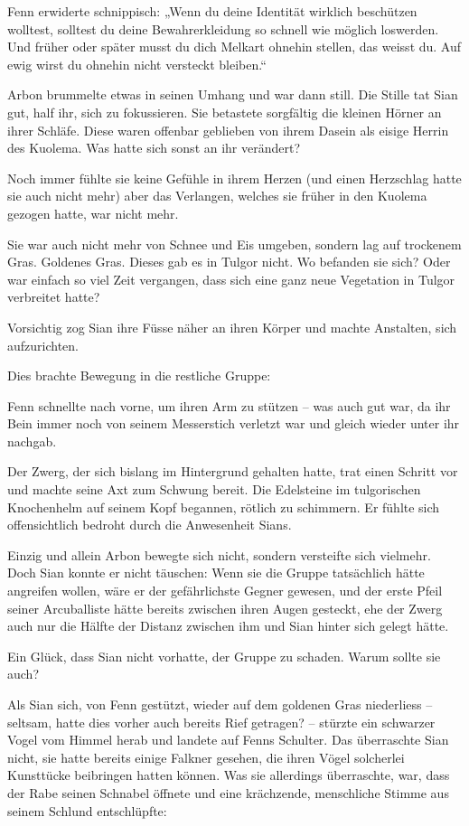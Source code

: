 \documentclass[10pt, a4paper, oneside]{book}
\begin{document}
Fenn erwiderte schnippisch: „Wenn du deine Identität wirklich beschützen wolltest, solltest du deine Bewahrerkleidung so schnell wie möglich loswerden. Und früher oder später musst du dich Melkart ohnehin stellen, das weisst du. Auf ewig wirst du ohnehin nicht versteckt bleiben.“

Arbon brummelte etwas in seinen Umhang und war dann still. Die Stille tat Sian gut, half ihr, sich zu fokussieren. Sie betastete sorgfältig die kleinen Hörner an ihrer Schläfe. Diese waren offenbar geblieben von ihrem Dasein als eisige Herrin des Kuolema. Was hatte sich sonst an ihr verändert? 

Noch immer fühlte sie keine Gefühle in ihrem Herzen (und einen Herzschlag hatte sie auch nicht mehr) aber das Verlangen, welches sie früher in den Kuolema gezogen hatte, war nicht mehr. 

Sie war auch nicht mehr von Schnee und Eis umgeben, sondern lag auf trockenem Gras. Goldenes Gras. Dieses gab es in Tulgor nicht. Wo befanden sie sich? Oder war einfach so viel Zeit vergangen, dass sich eine ganz neue Vegetation in Tulgor verbreitet hatte?

Vorsichtig zog Sian ihre Füsse näher an ihren Körper und machte Anstalten, sich aufzurichten.

Dies brachte Bewegung in die restliche Gruppe: 

Fenn schnellte nach vorne, um ihren Arm zu stützen – was auch gut war, da ihr Bein immer noch von seinem Messerstich verletzt war und gleich wieder unter ihr nachgab. 

Der Zwerg, der sich bislang im Hintergrund gehalten hatte, trat einen Schritt vor und machte seine Axt zum Schwung bereit. Die Edelsteine im tulgorischen Knochenhelm auf seinem Kopf begannen, rötlich zu schimmern. Er fühlte sich offensichtlich bedroht durch die Anwesenheit Sians.

Einzig und allein Arbon bewegte sich nicht, sondern versteifte sich vielmehr. Doch Sian konnte er nicht täuschen: Wenn sie die Gruppe tatsächlich hätte angreifen wollen, wäre er der gefährlichste Gegner gewesen, und der erste Pfeil seiner Arcuballiste hätte bereits zwischen ihren Augen gesteckt, ehe der Zwerg auch nur die Hälfte der Distanz zwischen ihm und Sian hinter sich gelegt hätte.

Ein Glück, dass Sian nicht vorhatte, der Gruppe zu schaden. Warum sollte sie auch?

Als Sian sich, von Fenn gestützt, wieder auf dem goldenen Gras niederliess – seltsam, hatte dies vorher auch bereits Rief getragen? – stürzte ein schwarzer Vogel vom Himmel herab und landete auf Fenns Schulter. Das überraschte Sian nicht, sie hatte bereits einige Falkner gesehen, die ihren Vögel solcherlei Kunsttücke beibringen hatten können. Was sie allerdings überraschte, war, dass der Rabe seinen Schnabel öffnete und eine krächzende, menschliche Stimme aus seinem Schlund entschlüpfte:
\end{document}
